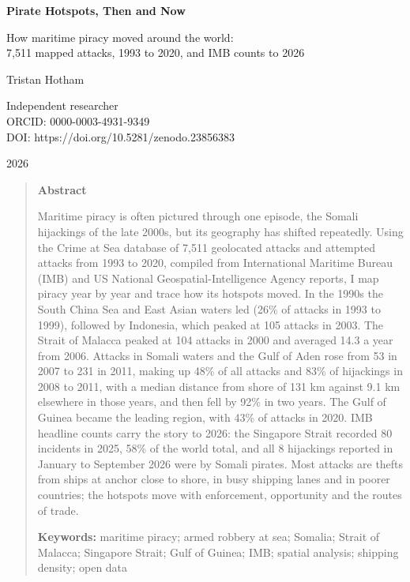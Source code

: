 \documentclass[11pt,a4paper]{article}
\begin{document}
\begin{center}
{\Large\bfseries Pirate Hotspots, Then and Now\par}
\vspace{0.4em}
{\large How maritime piracy moved around the world:\\7,511 mapped attacks, 1993 to 2020, and IMB counts to 2026\par}
\vspace{1.2em}
{\large Tristan Hotham\par}
\vspace{0.3em}
{\small Independent researcher\\
ORCID: 0000-0003-4931-9349\\
DOI: https://doi.org/10.5281/zenodo.23856383\par}
\vspace{0.8em}
2026
\end{center}

\begin{quote}
\small
\begin{center}\textbf{Abstract}\end{center}
Maritime piracy is often pictured through one episode, the Somali hijackings of the late 2000s, but its geography has shifted repeatedly. Using the Crime at Sea database of 7,511 geolocated attacks and attempted attacks from 1993 to 2020, compiled from International Maritime Bureau (IMB) and US National Geospatial-Intelligence Agency reports, I map piracy year by year and trace how its hotspots moved. In the 1990s the South China Sea and East Asian waters led (26\% of attacks in 1993 to 1999), followed by Indonesia, which peaked at 105 attacks in 2003. The Strait of Malacca peaked at 104 attacks in 2000 and averaged 14.3 a year from 2006. Attacks in Somali waters and the Gulf of Aden rose from 53 in 2007 to 231 in 2011, making up 48\% of all attacks and 83\% of hijackings in 2008 to 2011, with a median distance from shore of 131 km against 9.1 km elsewhere in those years, and then fell by 92\% in two years. The Gulf of Guinea became the leading region, with 43\% of attacks in 2020. IMB headline counts carry the story to 2026: the Singapore Strait recorded 80 incidents in 2025, 58\% of the world total, and all 8 hijackings reported in January to September 2026 were by Somali pirates. Most attacks are thefts from ships at anchor close to shore, in busy shipping lanes and in poorer countries; the hotspots move with enforcement, opportunity and the routes of trade.

\textbf{Keywords:} maritime piracy; armed robbery at sea; Somalia; Strait of Malacca; Singapore Strait; Gulf of Guinea; IMB; spatial analysis; shipping density; open data
\end{quote}
\end{document}
